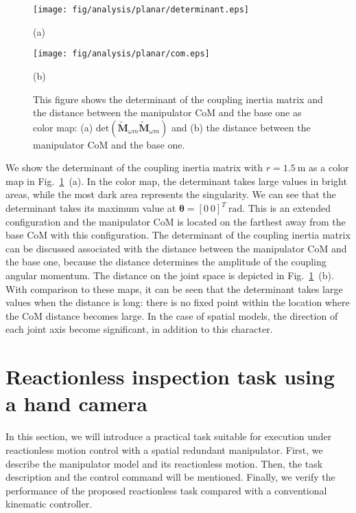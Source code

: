 \documentclass[preprint,12pt]{elsarticle}
\def\fig#1{{Fig.~\ref{fig:#1}}}
\def\th{{\bbm{\theta}}}
\def\unit#1{{~\mathrm{#1}}}
\def\tbm#1{{\tilde{\bbm{#1}}}}
\def\bbm#1{\bm{#1}}
\begin{document}
%
\begin{figure}[t]
  \centering
  \begin{minipage}[t]{0.42\linewidth}
    \centering
    \texttt{[image: fig/analysis/planar/determinant.eps]}
    \footnotesize\par{(a)}
  \end{minipage}
  \hspace{1mm}
  \begin{minipage}[t]{0.38\linewidth}
    \centering
    \texttt{[image: fig/analysis/planar/com.eps]}
    \footnotesize\par{(b)}
  \end{minipage}
  \caption{This figure shows the determinant of the coupling inertia matrix and
  the distance between the manipulator CoM and the base one as color map:
  (a) $\mathrm{det}(\tbm{M}_{\omega m}\tbm{M}_{\omega m})$ and (b) the distance between the manipulator CoM and the base one.}
  \label{fig:DET_FF2R}
\end{figure}
%
We show the determinant of the coupling inertia matrix 
with $r = 1.5\unit{m}$ as a color map in \fig{DET_FF2R}~(a).
In the color map, the determinant takes large values in bright areas, 
while the most dark area represents the singularity.
We can see that the determinant takes its maximum value at $\th = [0~0]^{T}\unit{rad}$.
This is an extended configuration and the manipulator CoM is located on
the farthest away from the base CoM with this configuration.
The determinant of the coupling inertia matrix can be discussed associated with the
distance between the manipulator CoM and the base one,
because the distance determines the amplitude of the coupling angular momentum.
The distance on the joint space is depicted in \fig{DET_FF2R}~(b).
With comparison to these maps,
it can be seen that the determinant takes large values when the distance is long:
there is no fixed point within the location where the CoM distance becomes large.
In the case of spatial models,
the direction of each joint axis become significant,
in addition to this character.


\section{Reactionless inspection task using a hand camera}
\label{sec:PROPOSAL}
In this section, we will introduce a practical task suitable for execution under
reactionless motion control with a spatial redundant manipulator.
First, we describe the manipulator model and its reactionless motion.
Then, the task description and the control command will be mentioned.
Finally, we verify the performance of the proposed reactionless
task compared with a conventional kinematic controller.
\end{document}
